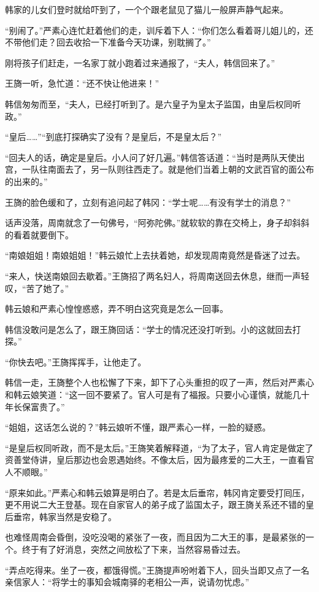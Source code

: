 韩家的儿女们登时就给吓到了，一个个跟老鼠见了猫儿一般屏声静气起来。

“别闹了。”严素心连忙赶着他们的走，训斥着下人：“你们怎么看着哥儿姐儿的，还不带他们走？回去收拾一下准备今天功课，别耽搁了。”

刚将孩子们赶走，一名家丁就小跑着过来通报了，“夫人，韩信回来了。”

王旖一听，急忙道：“还不快让他进来！”

韩信匆匆而至，“夫人，已经打听到了。是六皇子为皇太子监国，由皇后权同听政。”

“皇后……”“到底打探确实了没有？是皇后，不是皇太后？”

“回夫人的话，确定是皇后。小人问了好几遍。”韩信答话道：“当时是两队天使出宫，一队往南面去了，另一队则往西走了。就是他们当着上朝的文武百官的面公布的出来的。”

王旖的脸色缓和了，立刻有追问起了韩冈：“学士呢……有没有学士的消息？”

话声没落，周南就念了一句佛号，“阿弥陀佛。”就软软的靠在交椅上，身子却斜斜的看着就要倒下。

“南娘姐姐！南娘姐姐！”韩云娘忙上去扶着她，却发现周南竟然是昏迷了过去。

“来人，快送南娘回去歇着。”王旖招了两名妇人，将周南送回去休息，继而一声轻叹，“苦了她了。”

韩云娘和严素心惶惶惑惑，弄不明白这究竟是怎么一回事。

韩信没敢问是怎么了，跟王旖回话：“学士的情况还没打听到。小的这就回去打探。”

“你快去吧。”王旖挥挥手，让他走了。

韩信一走，王旖整个人也松懈了下来，卸下了心头重担的叹了一声，然后对严素心和韩云娘笑道：“这一回不要紧了。官人可是有了福报。只要小心谨慎，就能几十年长保富贵了。”

“姐姐，这话怎么说的？”韩云娘听不懂，跟严素心一样，一脸的疑惑。

“是皇后权同听政，而不是太后。”王旖笑着解释道，“为了太子，官人肯定是做定了资善堂侍讲，皇后那边也会恩遇始终。不像太后，因为最疼爱的二大王，一直看官人不顺眼。”

“原来如此。”严素心和韩云娘算是明白了。若是太后垂帘，韩冈肯定要受打囘压，更不用说二大王登基。现在自家官人的弟子成了监国太子，跟王旖关系还不错的皇后垂帘，韩家当然是安稳了。

也难怪周南会昏倒，没吃没喝的紧张了一夜，而且因为二大王的事，是最紧张的一个。终于有了好消息，突然之间放松了下来，当然容易昏过去。

“弄点吃得来。坐了一夜，都饿得慌。”王旖提声吩咐着下人，回头当即又点了一名亲信家人：“将学士的事知会城南驿的老相公一声，说请勿忧虑。”

